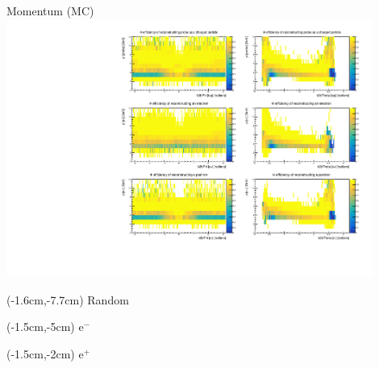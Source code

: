 \documentclass[10pt]{beamer}
\begin{document}
\begin{frame}{Momentum (MC)}
	\centering
	\includegraphics[width=0.9\textwidth]{Momentum/M_MC.pdf}

\begin{textblock*}{0.3\textwidth}(-1.6cm,-7.7cm)
	Random
\end{textblock*}

		\begin{textblock*}{0.3\textwidth}(-1.5cm,-5cm)
	$\textrm{e}^-$
\end{textblock*}
\begin{textblock*}{0.3\textwidth}(-1.5cm,-2cm)
	$\textrm{e}^+$
\end{textblock*}






\end{frame}
\end{document}
